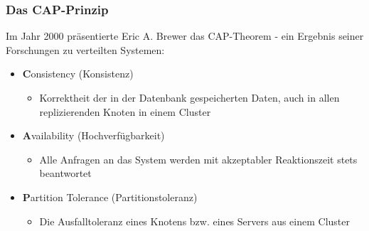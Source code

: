 \documentclass{beamer} %
\begin{document}
%
%
%




\begin{frame}
\frametitle{Das CAP-Prinzip}

Im Jahr 2000 präsentierte Eric A. Brewer das CAP-Theorem - ein Ergebnis seiner Forschungen zu verteilten Systemen:\newline
\begin{itemize}
\item  \textbf{C}onsistency (Konsistenz)
\begin{itemize}
\item Korrektheit der in der Datenbank gespeicherten Daten, auch in allen replizierenden Knoten in einem Cluster
\end{itemize}
\item  \textbf{A}vailability (Hochverfügbarkeit)
\begin{itemize}
\item Alle Anfragen an das System werden mit akzeptabler Reaktionszeit stets beantwortet 
\end{itemize}
\item  \textbf{P}artition Tolerance (Partitionstoleranz) 
\begin{itemize}
\item Die Ausfalltoleranz eines Knotens bzw. eines Servers aus einem Cluster
\end{itemize}

\end{itemize}

\end{frame}
\end{document}
